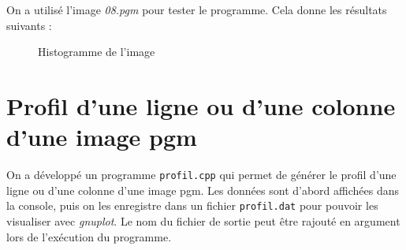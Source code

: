 \documentclass[french,a4paper,10pt]{article}
\begin{document}
	On a utilis\'e l'image \emph{08.pgm} pour tester le programme. Cela donne les r\'esultats suivants :
	\begin{figure}[!htb]
		\begin{minipage}{0.48\textwidth}
			\centering
			\caption{Donn\'ees de l'histogramme}\label{Fig:histo-data}
		\end{minipage}\hfill
		\begin{minipage}{0.48\textwidth}
			\centering
			\caption{Histogramme de l'image}\label{Fig:histo-plot}
		\end{minipage}
	\end{figure}

	\newpage
	\section{Profil d'une ligne ou d'une colonne d'une image pgm}\label{sec:4}
	On a d\'evelopp\'e un programme \texttt{profil.cpp} qui permet de g\'en\'erer le profil d'une ligne ou d'une
	colonne d'une image pgm.
	Les donn\'ees sont d'abord affich\'ees dans la console, puis on les enregistre dans un fichier \texttt{profil.dat}
	pour pouvoir les visualiser avec \emph{gnuplot}.
	Le nom du fichier de sortie peut \^etre rajout\'e en argument lors de l'ex\'ecution du programme.
\end{document}
